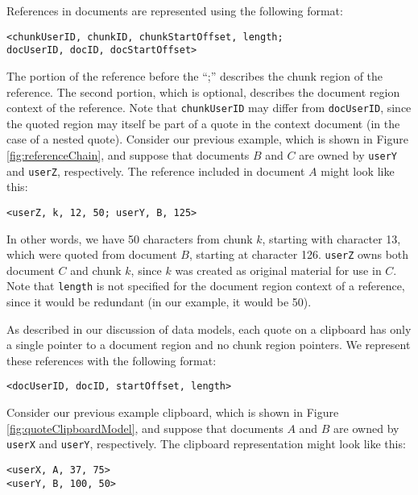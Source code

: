 \documentclass{acm_proc_article-sp}
\begin{document}
References in documents are represented using the following format:
\begin{center}
\texttt{<chunkUserID, chunkID, chunkStartOffset, length;\\ 
docUserID, docID, docStartOffset>} 
\end{center}
The portion of the reference before the ``;'' describes the chunk region of the reference.  
The second portion, which is optional, describes the document region context of the reference.  
Note that \texttt{chunkUserID} may differ from \texttt{docUserID}, since the quoted region may itself be part of a quote in the context document (in the case of a nested quote).
Consider our previous example, which is shown in Figure \ref{fig:referenceChain}, and suppose that documents $B$ and  $C$ are owned by \texttt{userY} and \texttt{userZ}, respectively.
The reference included in document $A$ might look like this:
\begin{center}
\texttt{<userZ, k, 12, 50; userY, B, 125>} 
\end{center}
In other words, we have 50 characters from chunk $k$, starting with character 13, which were quoted from document $B$, starting at character 126.
\texttt{userZ} owns both document $C$ and chunk $k$, since $k$ was created as original material for use in $C$.
Note that \texttt{length} is not specified for the document region context of a reference, since it would be redundant (in our example, it would be 50).


As described in our discussion of data models, each quote on a clipboard has only a single pointer to a document region and no chunk region pointers.
We represent these references with the following format:
\begin{center}
\texttt{<docUserID, docID, startOffset, length>} 
\end{center}
Consider our previous example clipboard, which is shown in Figure \ref{fig:quoteClipboardModel}, and suppose that documents $A$ and  $B$ are owned by \texttt{userX} and \texttt{userY}, respectively.
The clipboard representation might look like this:
\begin{center}
\texttt{<userX, A, 37, 75>}\\
\texttt{<userY, B, 100, 50>}\\ 
\end{center}
\end{document}
